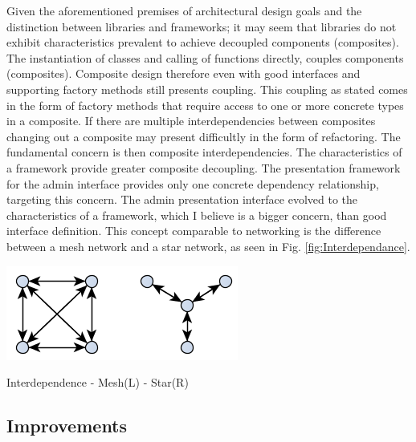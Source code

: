 		\vspace{-2mm}
		\normalsize
		{		
			Given the aforementioned premises of architectural design goals and the distinction between libraries and frameworks; 
			it may seem that libraries do not exhibit characteristics prevalent to achieve decoupled components (composites).  The instantiation
			of classes and calling of functions directly, couples components (composites).
			\newline
			\newline		
			Composite design therefore even with good interfaces and supporting factory methods still presents coupling.  This coupling as stated comes in the form 
			of factory methods that require access to one or more concrete types in a composite.  If there are multiple interdependencies between composites
			changing out a composite may present difficultly in the form of refactoring.
			\newline
			\newline
			The fundamental concern is then composite interdependencies.  The characteristics of a framework provide greater composite decoupling.  
			The presentation framework for the admin interface provides only one concrete dependency relationship, targeting this concern.		
			The admin presentation interface evolved to the characteristics of a framework, which I believe is a bigger concern, than good interface
			definition.  This concept comparable to networking is the difference between a mesh network and a star network, as seen in Fig. \ref{fig:Interdependance}.
			\newline
		}
		
		\begin{figurehere}
			\centering
			\includegraphics[scale=1.0]{pages/chapter3/figures/interdependance.png}
			\caption{Interdependence - Mesh(L) - Star(R)}
			\label{fig:Interdependance}
		\end{figurehere}
	
\newpage	
	
	\subsection{Improvements}

